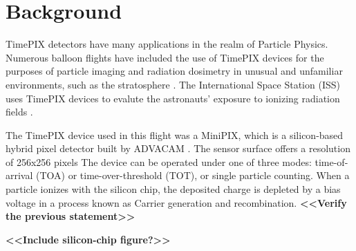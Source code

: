 
\section{Background}
\label{Background}

TimePIX detectors have many applications in the realm of Particle Physics. Numerous balloon flights have included the use of TimePIX devices for the purposes of particle imaging and radiation dosimetry in unusual and unfamiliar environments, such as the stratosphere \cite{bexus}. The International Space Station (ISS) uses TimePIX devices to evalute the astronauts' exposure to ionizing radiation fields \cite{timepixiss}.

The TimePIX device used in this flight was a MiniPIX, which is a silicon-based hybrid pixel detector built by ADVACAM \cite{advacam}. The sensor surface offers a resolution of 256x256 pixels The device can be operated under one of three modes: time-of-arrival (TOA) or time-over-threshold (TOT), or single particle counting. When a particle ionizes with the silicon chip, the deposited charge is depleted by a bias voltage in a process known as Carrier generation and recombination. \textbf{<<Verify the previous statement>>}

\textbf{<<Include silicon-chip figure?>>}
